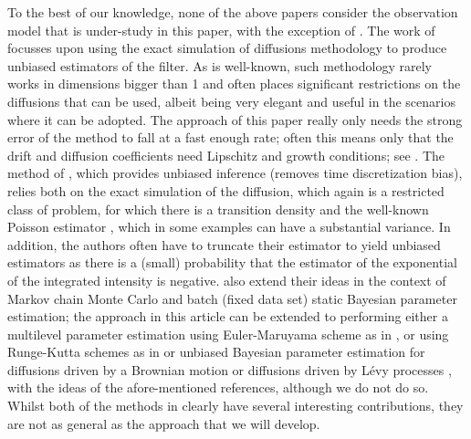 \documentclass[english]{article}
\begin{document}
To the best of our knowledge, none of the above papers consider the observation model that is under-study in this paper, with the exception of \cite{fearn,jin}. The work of \cite{fearn} focusses upon using the exact simulation of diffusions methodology to produce unbiased estimators of the filter. As is well-known, such methodology rarely works in dimensions bigger than 1 and often places significant restrictions on the diffusions that can be used, albeit being very elegant and useful in the scenarios where it can be adopted. The approach of this paper really only needs the strong error of the 
 method to fall at a fast enough rate; often this means only that the drift and diffusion coefficients need Lipschitz and growth conditions; see \cite{kloeden}. The method of \cite{jin}, which provides unbiased inference (removes time discretization bias), relies both on the exact simulation of the diffusion, which again is a restricted class of problem, for which there is a transition density and the well-known Poisson estimator \cite{wagner}, which in some examples can have a substantial variance. In addition, the authors often have to truncate their estimator to yield unbiased estimators as there is a (small) probability that the estimator of the exponential of the integrated intensity is negative. 
\cite{jin} also extend their ideas in the context of Markov chain Monte Carlo and batch (fixed data set) static Bayesian parameter estimation; the approach in this article can be extended to performing either a multilevel parameter estimation using Euler-Maruyama scheme as in \cite{jasra_bpe_sde}, or using Runge-Kutta schemes as in \cite{del_Bayes} or unbiased Bayesian parameter estimation for diffusions driven by a Brownian motion \cite{chada_ub} or diffusions driven by L\'{e}vy processes \cite{bayes_levy}, with the ideas of the afore-mentioned references, although we do not do so.
Whilst both of the methods in \cite{fearn,jin} clearly have several interesting contributions, they are not as general as the approach that we will develop.
\end{document}
